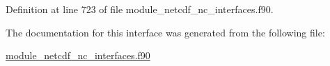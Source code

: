 Definition at line 723 of file module\+\_\+netcdf\+\_\+nc\+\_\+interfaces.\+f90.



The documentation for this interface was generated from the following file\+:\begin{DoxyCompactItemize}
\item 
\hyperlink{module__netcdf__nc__interfaces_8f90}{module\+\_\+netcdf\+\_\+nc\+\_\+interfaces.\+f90}\end{DoxyCompactItemize}
